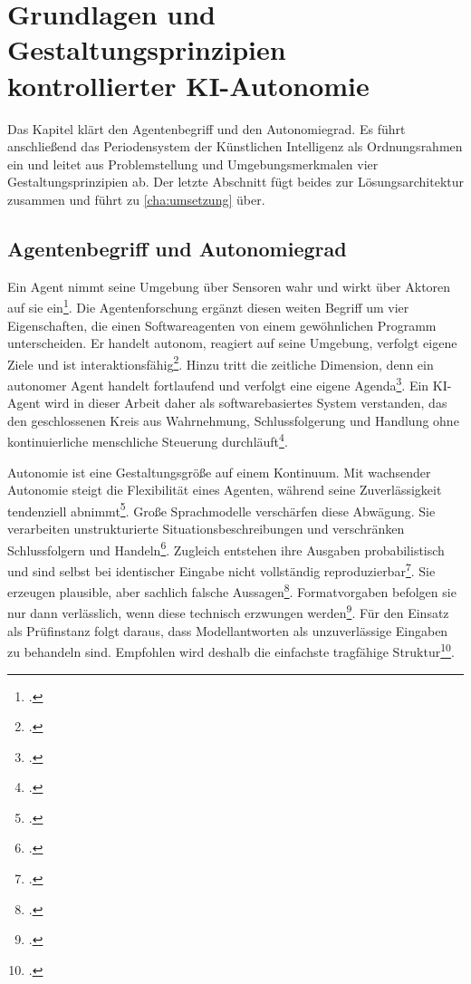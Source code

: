 
\chapter{Grundlagen und Gestaltungsprinzipien kontrollierter KI-Autonomie}
\label{cha:grundlagen}

Das Kapitel klärt den Agentenbegriff und den Autonomiegrad. Es führt
anschließend das Periodensystem der Künstlichen Intelligenz als Ordnungsrahmen ein und leitet aus Problemstellung und Umgebungsmerkmalen vier Gestaltungsprinzipien ab. Der letzte Abschnitt fügt beides zur
Lösungsarchitektur zusammen und führt zu \cref{cha:umsetzung} über.

\section{Agentenbegriff und Autonomiegrad}
\label{sec:grundlagen-agentenbegriff}

Ein Agent nimmt seine Umgebung über Sensoren wahr und wirkt über Aktoren auf sie
ein\footcite[vgl.][S.~36]{russellNorvig2021}. Die Agentenforschung ergänzt diesen
weiten Begriff um vier Eigenschaften, die einen Softwareagenten von einem
gewöhnlichen Programm unterscheiden. Er handelt autonom, reagiert auf seine Umgebung,
verfolgt eigene Ziele und ist
interaktionsfähig\footcites[vgl.][S.~116]{wooldridgeJennings1995}[vgl.][S.~26\,f.]{wooldridge2009}.
Hinzu tritt die zeitliche Dimension, denn ein autonomer Agent handelt fortlaufend und
verfolgt eine eigene Agenda\footcite[vgl.][S.~25]{franklinGraesser1997}. Ein KI-Agent wird in dieser Arbeit daher als softwarebasiertes System verstanden, das den geschlossenen Kreis aus Wahrnehmung, Schlussfolgerung und Handlung ohne kontinuierliche menschliche Steuerung
durchläuft\footcite[vgl.][S.~303]{gollnick2025}.

Autonomie ist eine Gestaltungsgröße auf einem Kontinuum. Mit wachsender Autonomie steigt
die Flexibilität eines Agenten, während seine Zuverlässigkeit tendenziell
abnimmt\footcite[vgl.][S.~303\,f.]{gollnick2025}. Große Sprachmodelle verschärfen
diese Abwägung. Sie verarbeiten unstrukturierte Situationsbeschreibungen und
verschränken Schlussfolgern und
Handeln\footcites[vgl.][]{yao2023react}[vgl.][]{wangSurvey2024}. Zugleich entstehen ihre Ausgaben
probabilistisch und sind selbst bei identischer Eingabe nicht vollständig
reproduzierbar\footcite[vgl.][]{he2025nondeterminism}. Sie erzeugen plausible, aber
sachlich falsche Aussagen\footcites[vgl.][S.~59]{gollnick2025}[vgl.][S.~1--38]{ji2023}[vgl.][S.~1]{huangHallucination2025}.
Formatvorgaben befolgen sie nur dann verlässlich, wenn diese technisch erzwungen
werden\footcite[vgl.][S.~10932--10952]{gengGcd2023}. Für den
Einsatz als Prüfinstanz folgt daraus, dass Modellantworten als unzuverlässige
Eingaben zu behandeln sind. Empfohlen wird deshalb die einfachste tragfähige
Struktur\footcite[vgl.][]{anthropicAgents2024}.

